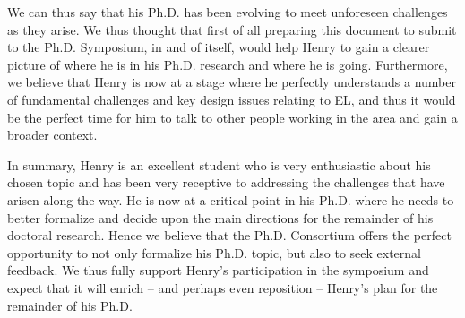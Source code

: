 \documentclass[sigconf]{acmart}
\begin{document}
We can thus say that his Ph.D. has been evolving to meet unforeseen challenges as they arise. We thus thought that first of all preparing this document to submit to the Ph.D. Symposium, in and of itself, would help Henry to gain a clearer picture of where he is in his Ph.D. research and where he is going. Furthermore, we believe that Henry is now at a stage where he perfectly understands a number of fundamental challenges and key design issues relating to EL, and thus it would be the perfect time for him to talk to other people working in the area and gain a broader context.

In summary, Henry is an excellent student who is very enthusiastic about his chosen topic and has been very receptive to addressing the challenges that have arisen along the way. He is now at a critical point in his Ph.D. where he needs to better formalize and decide upon the main directions for the remainder of his doctoral research. Hence we believe that the Ph.D. Consortium offers the perfect opportunity to not only formalize his Ph.D. topic, but also to seek external feedback. We thus fully support Henry's participation in the symposium and expect that it will enrich -- and perhaps even reposition -- Henry's plan for the remainder of his Ph.D.
\end{document}
